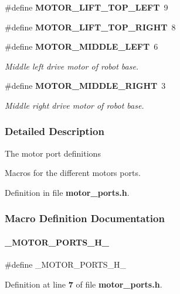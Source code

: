 \begin{DoxyCompactItemize}
\#define \textbf{ M\+O\+T\+O\+R\+\_\+\+L\+I\+F\+T\+\_\+\+T\+O\+P\+\_\+\+L\+E\+FT}~9
\item 
\#define \textbf{ M\+O\+T\+O\+R\+\_\+\+L\+I\+F\+T\+\_\+\+T\+O\+P\+\_\+\+R\+I\+G\+HT}~8
\item 
\#define \textbf{ M\+O\+T\+O\+R\+\_\+\+M\+I\+D\+D\+L\+E\+\_\+\+L\+E\+FT}~6
\begin{DoxyCompactList}\small\item\em Middle left drive motor of robot base. \end{DoxyCompactList}\item 
\#define \textbf{ M\+O\+T\+O\+R\+\_\+\+M\+I\+D\+D\+L\+E\+\_\+\+R\+I\+G\+HT}~3
\begin{DoxyCompactList}\small\item\em Middle right drive motor of robot base. \end{DoxyCompactList}\end{DoxyCompactItemize}


\subsubsection{Detailed Description}
The motor port definitions

Macros for the different motors ports. 



Definition in file \textbf{ motor\+\_\+ports.\+h}.



\subsubsection{Macro Definition Documentation}
\mbox{\label{motor__ports_8h_a96b0e64c39730b0c4ca0d9e493bc0f58}} 
\paragraph{\+\_\+\+M\+O\+T\+O\+R\+\_\+\+P\+O\+R\+T\+S\+\_\+\+H\+\_\+}
{\footnotesize\ttfamily \#define \+\_\+\+M\+O\+T\+O\+R\+\_\+\+P\+O\+R\+T\+S\+\_\+\+H\+\_\+}



Definition at line \textbf{ 7} of file \textbf{ motor\+\_\+ports.\+h}.

